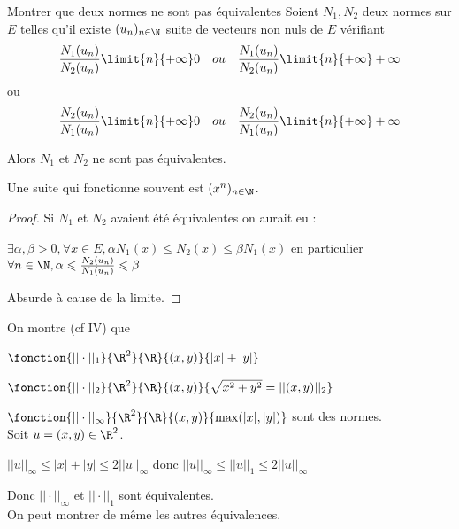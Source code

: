 \begin{proposition}{Montrer que deux normes ne sont pas équivalentes}{}
    Soient $N_1, N_2$ deux normes sur $E$ telles qu'il existe $(u_n)_{n \in \N}$ suite
    de vecteurs non nuls de $E$ vérifiant 
    $$ \frac{N_1(u_n )}{N_2(u_n )} \limit{n}{+ \infty} 0 \quad ou \quad \frac{N_1(u_n )}{N_2(u_n )} \limit{n}{+ \infty} + \infty$$ 
    ou
    $$ \frac{N_2(u_n )}{N_1(u_n )} \limit{n}{+ \infty} 0 \quad ou \quad \frac{N_2(u_n )}{N_1(u_n )} \limit{n}{+ \infty} + \infty$$ 

    Alors $N_1$ et $N_2$ ne sont pas équivalentes.
\end{proposition}

\begin{remarque}
    Une suite qui fonctionne souvent est $(x^n)_{n \in \N}$.
\end{remarque}


\begin{proof}
    Si $N_1$ et $N_2$ avaient été équivalentes on aurait eu :
    
    $\exists \alpha, \beta > 0, \forall x \in E, \alpha N_1(x) \leqslant N_2(x) \leqslant \beta N_1(x)$
    en particulier $\forall n \in \N, \alpha \leqslant \frac{N_2(u_n)}{N_1(u_n)} \leqslant \beta$

    Absurde à cause de la limite.
\end{proof}


\begin{exemple}
    On montre (cf IV) que 

    $\fonction{|| \cdot ||_1}{\R^2}{\R}{(x, y)}{|x| + |y|}$

    $\fonction{|| \cdot ||_2}{\R^2}{\R}{(x, y)}{\sqrt{x^2 + y^2} = ||(x, y)||_2}$

    $\fonction{|| \cdot ||_\infty}{\R^2}{\R}{(x, y)}{\max (|x|, |y|)}$
    sont des normes. \\

    Soit $u = (x, y) \in \R^2$. 

    $|| u ||_\infty \leqslant |x| + |y| \leqslant 2 ||u||_\infty$
    donc $|| u ||_\infty \leqslant ||u||_1 \leqslant 2 ||u||_\infty$

    Donc $|| \cdot ||_\infty$ et $|| \cdot ||_1$ sont équivalentes. \\

    On peut montrer de même les autres équivalences.
\end{exemple}

